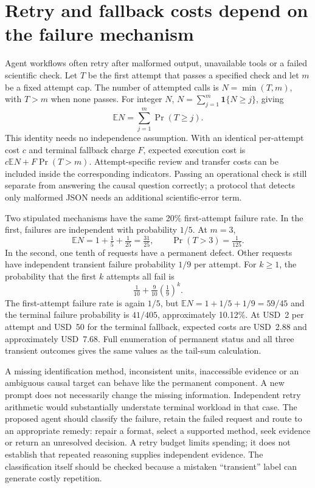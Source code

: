\section{Retry and fallback costs depend on the failure mechanism}
\label{exec14:l8-retry}

Agent workflows often retry after malformed output, unavailable tools or a
failed scientific check. Let $T$ be the first attempt that passes a specified
check and let $m$ be a fixed attempt cap. The number of attempted calls is
$N=\min(T,m)$, with $T>m$ when none passes. For integer $N$,
$N=\sum_{j=1}^{m}\mathbf1\{N\geq j\}$, giving
\[
 \mathbb E N=\sum_{j=1}^{m}\Pr(T\geq j).
\]
This identity needs no independence assumption. With an identical per-attempt
cost $c$ and terminal fallback charge $F$, expected execution cost is
$c\mathbb E N+F\Pr(T>m)$. Attempt-specific review and transfer costs can be
included inside the corresponding indicators. Passing an operational check
is still separate from answering the causal question correctly; a protocol
that detects only malformed JSON needs an additional scientific-error term.
\citep{exec14_l8_economics}

Two stipulated mechanisms have the same 20\% first-attempt failure rate.
In the first, failures are independent with probability $1/5$. At $m=3$,
\[
 \mathbb E N=1+\tfrac15+\tfrac1{25}=\tfrac{31}{25},
 \qquad \Pr(T>3)=\tfrac1{125}.
\]
In the second, one tenth of requests have a permanent defect. Other requests
have independent transient failure probability $1/9$ per attempt. For $k\geq1$,
the probability that the first $k$ attempts all fail is
\[
 \tfrac1{10}+\tfrac9{10}\left(\tfrac19\right)^k.
\]
The first-attempt failure rate is again $1/5$, but
$\mathbb E N=1+1/5+1/9=59/45$ and the terminal failure probability is
$41/405$, approximately 10.12\%. At USD~2 per attempt and USD~50 for the
terminal fallback, expected costs are USD~2.88 and approximately USD~7.68.
Full enumeration of permanent status and all three transient outcomes gives
the same values as the tail-sum calculation. \citep{exec14_l8_economics}

A missing identification method, inconsistent units, inaccessible evidence or
an ambiguous causal target can behave like the permanent component. A new
prompt does not necessarily change the missing information. Independent
retry arithmetic would substantially understate terminal workload in that
case. The proposed agent should classify the failure, retain the failed
request and route to an appropriate remedy: repair a format, select a supported
method, seek evidence or return an unresolved decision. A retry budget limits
spending; it does not establish that repeated reasoning supplies independent
evidence. The classification itself should be checked because a mistaken
``transient'' label can generate costly repetition.

